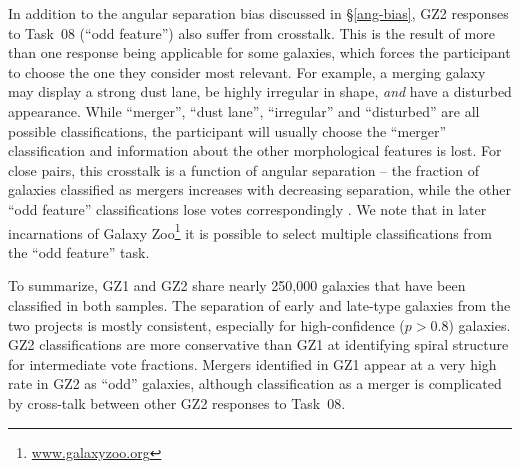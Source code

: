 \documentclass[useAMS,usenatbib]{mn2e}
\begin{document}
In addition to the angular separation bias discussed in \S\ref{ang-bias}, GZ2 responses to Task~08 (``odd feature'') also suffer from crosstalk. This is the result of more than one response being applicable for some galaxies, which forces the participant to choose the one they consider most relevant. For example, a merging galaxy may display a strong dust lane, be highly irregular in shape, {\em and} have a disturbed appearance. While ``merger'', ``dust lane'', ``irregular'' and ``disturbed'' are all possible classifications, the participant will usually choose the ``merger'' classification and information about the other morphological features is lost. For close pairs, this crosstalk is a function of angular separation -- the fraction of galaxies classified as mergers increases with decreasing separation, while the other ``odd feature'' classifications lose votes correspondingly \citep{cas13}. We note that in later incarnations of Galaxy Zoo\footnote{\url{www.galaxyzoo.org}} it is possible to select multiple classifications from the ``odd feature'' task.


To summarize, GZ1 and GZ2 share nearly 250,000 galaxies that have been classified in both samples. The separation of early and late-type galaxies from the two projects is mostly consistent, especially for high-confidence ($p>0.8$) galaxies. GZ2 classifications are more conservative than GZ1 at identifying spiral structure for intermediate vote fractions. Mergers identified in GZ1 appear at a very high rate in GZ2 as ``odd'' galaxies, although classification as a merger is complicated by cross-talk between other GZ2 responses to Task~08. 
\end{document}
